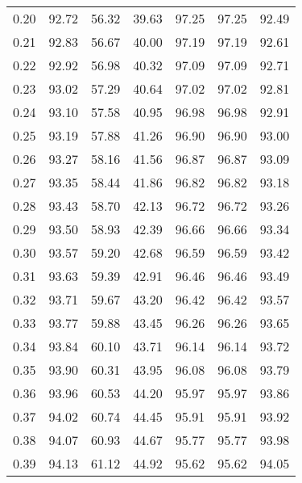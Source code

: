 \begin{tabular}{|c|c|c|c|c|c|c|}
      0.20 &     92.72 &     56.32 &      39.63 &   97.25 &      97.25 &         92.49 \\
      0.21 &     92.83 &     56.67 &      40.00 &   97.19 &      97.19 &         92.61 \\
      0.22 &     92.92 &     56.98 &      40.32 &   97.09 &      97.09 &         92.71 \\
      0.23 &     93.02 &     57.29 &      40.64 &   97.02 &      97.02 &         92.81 \\
      0.24 &     93.10 &     57.58 &      40.95 &   96.98 &      96.98 &         92.91 \\
      0.25 &     93.19 &     57.88 &      41.26 &   96.90 &      96.90 &         93.00 \\
      0.26 &     93.27 &     58.16 &      41.56 &   96.87 &      96.87 &         93.09 \\
      0.27 &     93.35 &     58.44 &      41.86 &   96.82 &      96.82 &         93.18 \\
      0.28 &     93.43 &     58.70 &      42.13 &   96.72 &      96.72 &         93.26 \\
      0.29 &     93.50 &     58.93 &      42.39 &   96.66 &      96.66 &         93.34 \\
      0.30 &     93.57 &     59.20 &      42.68 &   96.59 &      96.59 &         93.42 \\
      0.31 &     93.63 &     59.39 &      42.91 &   96.46 &      96.46 &         93.49 \\
      0.32 &     93.71 &     59.67 &      43.20 &   96.42 &      96.42 &         93.57 \\
      0.33 &     93.77 &     59.88 &      43.45 &   96.26 &      96.26 &         93.65 \\
      0.34 &     93.84 &     60.10 &      43.71 &   96.14 &      96.14 &         93.72 \\
      0.35 &     93.90 &     60.31 &      43.95 &   96.08 &      96.08 &         93.79 \\
      0.36 &     93.96 &     60.53 &      44.20 &   95.97 &      95.97 &         93.86 \\
      0.37 &     94.02 &     60.74 &      44.45 &   95.91 &      95.91 &         93.92 \\
      0.38 &     94.07 &     60.93 &      44.67 &   95.77 &      95.77 &         93.98 \\
      0.39 &     94.13 &     61.12 &      44.92 &   95.62 &      95.62 &         94.05 \\

\end{tabular}
